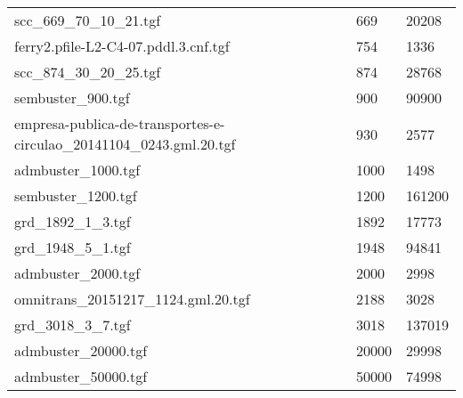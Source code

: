 \begin{longtable}{| p{} | p{} | p{} | }
scc\_669\_70\_10\_21.tgf                                             & 669       & 20208   \\
ferry2.pfile-L2-C4-07.pddl.3.cnf.tgf                                 & 754       & 1336    \\
scc\_874\_30\_20\_25.tgf                                             & 874       & 28768   \\
sembuster\_900.tgf                                                   & 900       & 90900   \\
empresa-publica-de-transportes-e-circulao\_20141104\_0243.gml.20.tgf & 930       & 2577    \\
admbuster\_1000.tgf                                                  & 1000      & 1498    \\
sembuster\_1200.tgf                                                  & 1200      & 161200  \\
grd\_1892\_1\_3.tgf                                                  & 1892      & 17773   \\
grd\_1948\_5\_1.tgf                                                  & 1948      & 94841   \\
admbuster\_2000.tgf                                                  & 2000      & 2998    \\
omnitrans\_20151217\_1124.gml.20.tgf                                 & 2188      & 3028    \\
grd\_3018\_3\_7.tgf                                                  & 3018      & 137019  \\
admbuster\_20000.tgf                                                 & 20000     & 29998   \\
admbuster\_50000.tgf                                                 & 50000     & 74998  
\end{longtable}


